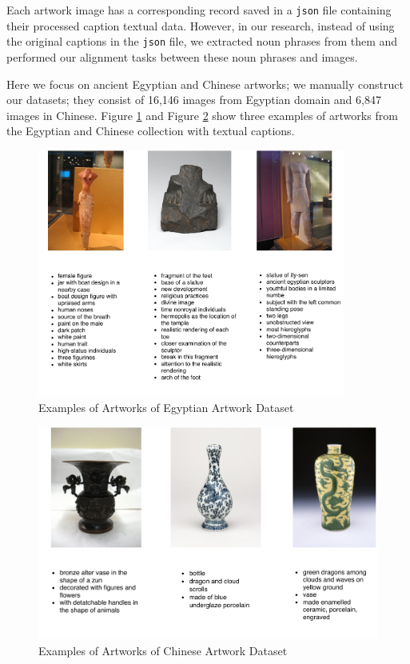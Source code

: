 Each artwork image has a corresponding record saved in a \verb|json| file containing their processed caption textual data. However, in our research, instead of using the original captions in the \verb|json| file, we extracted noun phrases from them and performed our alignment tasks between these noun phrases and images.

Here we focus on ancient Egyptian and Chinese artworks; we manually construct our datasets; they consist of 16,146 images from Egyptian domain and 6,847 images in Chinese. Figure \ref{fig:sampleEgyptian} and Figure \ref{fig:sampleChinese} show three examples of artworks from the Egyptian and Chinese collection with textual captions.

\begin{figure}[h!]
\centering
\includegraphics[width=0.9\textwidth]{egyptian.pdf}
\caption{Examples of Artworks of Egyptian Artwork Dataset}
\label{fig:sampleEgyptian}
\end{figure}

\begin{figure}[h!]
\centering
\includegraphics[width=\textwidth]{chinese.pdf}
\caption{Examples of Artworks of Chinese Artwork Dataset}
\label{fig:sampleChinese}
\end{figure}

